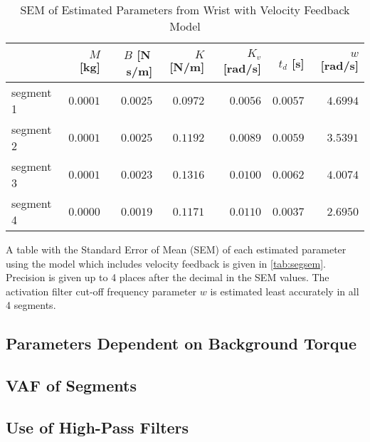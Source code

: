 \documentclass[11pt,a4paper]{article}
\begin{document}
\begin{table}
    \centering
    \begin{tabular}{|l|r|r|r|r|r|r|}
        \hline
        \nonumber & $M$ [kg] & $B$ [N\,s/m] & $K$ [N/m] & $K_v$ [rad/s] &
            $t_d$ [s] & $w$ [rad/s] \\
        \hline
        segment 1 &
            $0.0001$ & $0.0025$ & $0.0972$ & $0.0056$ & $0.0057$ & $4.6994$ \\
        segment 2 &
            $0.0001$ & $0.0025$ & $0.1192$ & $0.0089$ & $0.0059$ & $3.5391$ \\
        segment 3 &
            $0.0001$ & $0.0023$ & $0.1316$ & $0.0100$ & $0.0062$ & $4.0074$ \\
        segment 4 &
            $0.0000$ & $0.0019$ & $0.1171$ & $0.0110$ & $0.0037$ & $2.6950$ \\
        \hline
    \end{tabular}
    \caption{SEM of Estimated Parameters from Wrist with Velocity Feedback
        Model}
    \label{tab:segsem}
\end{table}

A table with the Standard Error of Mean (SEM) of each estimated parameter using
the model which includes velocity feedback is given in \autoref{tab:segsem}.
Precision is given up to 4 places after the decimal in the SEM values. The
activation filter cut-off frequency parameter $w$ is estimated least accurately
in all 4 segments.


\subsection{Parameters Dependent on Background Torque}

\subsection{VAF of Segments}

\subsection{Use of High-Pass Filters}
\end{document}

